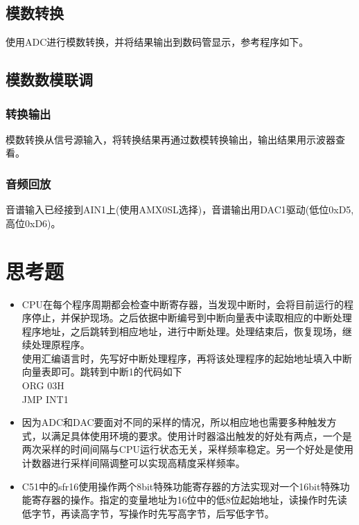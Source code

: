 \documentclass{article}
\begin{document}
\begin{CJK}{UTF8}{gkai}
\subsection{模数转换}
使用ADC进行模数转换，并将结果输出到数码管显示，参考程序如下。
	
\subsection{模数数模联调}
\subsubsection{转换输出}
模数转换从信号源输入，将转换结果再通过数模转换输出，输出结果用示波器查看。
	
\subsubsection{音频回放}
音谱输入已经接到AIN1上(使用AMX0SL选择)，音谱输出用DAC1驱动(低位0xD5,高位0xD6)。


\section{思考题}
\begin{itemize}
	\item CPU在每个程序周期都会检查中断寄存器，当发现中断时，会将目前运行的程序停止，并保护现场。之后依据中断编号到中断向量表中读取相应的中断处理程序地址，之后跳转到相应地址，进行中断处理。处理结束后，恢复现场，继续处理原程序。\\
	使用汇编语言时，先写好中断处理程序，再将该处理程序的起始地址填入中断向量表即可。跳转到中断1的代码如下\\
	ORG 03H\\
	JMP INT1
	\item 因为ADC和DAC要面对不同的采样的情况，所以相应地也需要多种触发方式，以满足具体使用环境的要求。使用计时器溢出触发的好处有两点，一个是两次采样的时间间隔与CPU运行状态无关，采样频率稳定。另一个好处是使用计数器进行采样间隔调整可以实现高精度采样频率。
	\item C51中的sfr16使用操作两个8bit特殊功能寄存器的方法实现对一个16bit特殊功能寄存器的操作。指定的变量地址为16位中的低8位起始地址，读操作时先读低字节，再读高字节，写操作时先写高字节，后写低字节。
\end{itemize}

\end{CJK}
\end{document}
